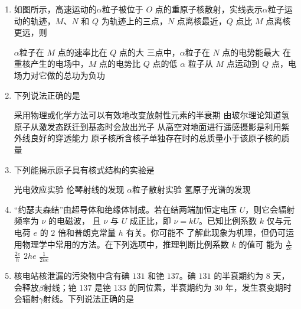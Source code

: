 
\begin{enumerate}
	\item
{}
如图所示，高速运动的$ \alpha $粒子被位于 $ O $ 点的重原子核散射，实线表示$ \alpha $粒子运动的轨迹，$ M $、$ N $
和 $ Q $ 为轨迹上的三点，$ N $ 点离核最近，$ Q $ 点比 $ M $ 点离核更远，则  
\begin{figure}[h!]
	\centering
	
\end{figure}


\fourchoices
{$ \alpha $粒子在 $ M $ 点的速率比在 $ Q $ 点的大}
{三点中，$ \alpha $粒子在 $ N $ 点的电势能最大}
{在重核产生的电场中，$ M $ 点的电势比 $ Q $ 点的低}
{$ \alpha $ 粒子从 $ M $ 点运动到 $ Q $ 点，电场力对它做的总功为负功}



\item 
{}
下列说法正确的是  

\fourchoices
{采用物理或化学方法可以有效地改变放射性元素的半衰期}
{由玻尔理论知道氢原子从激发态跃迁到基态时会放出光子}
{从高空对地面进行遥感摄影是利用紫外线良好的穿透能力}
{原子核所含核子单独存在时的总质量小于该原子核的质量}



\item
{}
下列能揭示原子具有核式结构的实验是  

\fourchoices
{光电效应实验}
{伦琴射线的发现}
{$ \alpha $粒子散射实验}
{氢原子光谱的发现}


\item 
{}
“约瑟夫森结”由超导体和绝缘体制成。若在结两端加恒定电压 $ U $，则它会辐射频率为 $ \nu $ 的电磁波，
且 $ \nu $ 与 $ U $ 成正比，即 $ \nu=kU $。已知比例系数 $ k $ 仅与元电荷 $ e $ 的 $ 2 $ 倍和普朗克常量 $ h $ 有关。你可能不
了解此现象为机理，但仍可运用物理学中常用的方法。在下列选项中，推理判断比例系数 $ k $ 的值可
能为  
\fourchoices
{$\frac{h}{2 e}$}
{$\frac{2 e}{h}$}
{$ 2 he $}
{$\frac{1}{2 h e}$}



\item 
{}
核电站核泄漏的污染物中含有碘 $ 131 $ 和铯 $ 137 $。碘 $ 131 $ 的半衰期约为 $ 8 $ 天，会释放$ \beta $射线；铯
$ 137 $ 是铯 $ 133 $ 的同位素，半衰期约为 $ 30 $ 年，发生衰变期时会辐射$ \gamma $射线。下列说法正确的是  


\end{enumerate}
